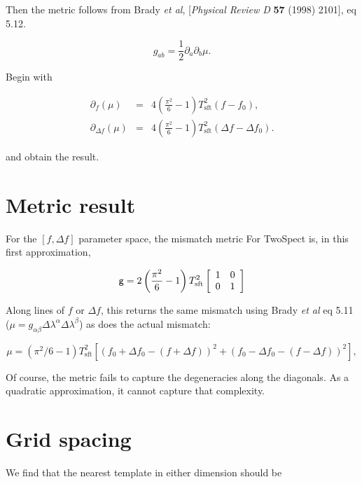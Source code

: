 \documentclass{article}
\begin{document}
\noindent Then the metric follows from
Brady \textit{et al}, [\textit{Physical Review D} \textbf{57} (1998) 2101], eq 5.12.

\begin{equation}
g_{ab} = \frac{1}{2} \partial_a \partial_b \mu.
\end{equation}

\noindent Begin with

\begin{eqnarray}
\partial_f (\mu) &=& 4 \left(\frac{\pi^2}{6} -1\right) T_\mathrm{sft}^2 (f-f_0),\\
\partial_{\Delta f} (\mu) &=& 4 \left(\frac{\pi^2}{6}-1\right) T_\mathrm{sft}^2 (\Delta f - \Delta f_0).
\end{eqnarray}

\noindent and obtain the result.

\section{Metric result}

For the $[f, \Delta f]$ parameter space, the mismatch metric For TwoSpect is, in this first approximation,

\begin{equation}
  \mathsf{g} = 2 \left(\frac{\pi^2}{6} - 1\right) T_\mathrm{sft}^2  
  \left[ 
  \begin{array}{c c}
  1 & 0\\
  0 & 1
  \end{array}
  \right]
\end{equation}

Along lines of $f$ or $\Delta f$, this returns
the same mismatch using Brady \textit{et al} eq 5.11 ($\mu = g_{\alpha\beta} \Delta \lambda^\alpha \Delta \lambda^\beta$) as does the actual mismatch:

\begin{equation}
\mu = (\pi^2/6 -1) T_\mathrm{sft}^2 
        [(f_0 + \Delta f_0 - (f + \Delta f))^2 + (f_0 - \Delta f_0 - (f - \Delta f))^2 ],
\end{equation}

Of course, the metric
fails to capture the degeneracies along the diagonals.
As a quadratic approximation, it cannot capture that complexity.

\section{Grid spacing}

We find that the nearest template in either dimension should be
\end{document}
